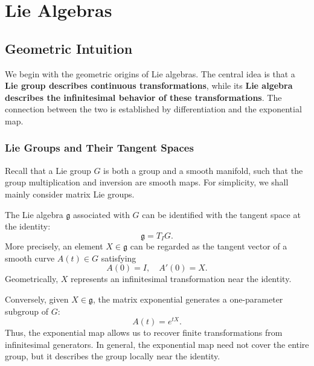 \documentclass[../main.tex]{subfiles}
\begin{document}
\chapter{Lie Algebras}

\section{Geometric Intuition}

We begin with the geometric origins of Lie algebras. The central idea is that a \textbf{Lie group describes continuous transformations}, while its \textbf{Lie algebra describes the infinitesimal behavior of these transformations}. The connection between the two is established by differentiation and the exponential map.

\subsection{Lie Groups and Their Tangent Spaces}

Recall that a Lie group $G$ is both a group and a smooth manifold, such that the group multiplication and inversion are smooth maps. For simplicity, we shall mainly consider matrix Lie groups.

The Lie algebra $\mathfrak{g}$ associated with $G$ can be identified with the tangent space at the identity:
\begin{equation}
  \mathfrak{g}=T_I G.
\end{equation}
More precisely, an element $X\in\mathfrak{g}$ can be regarded as the tangent vector of a smooth curve $A(t)\in G$ satisfying
\begin{equation}
  A(0)=I,\quad A'(0)=X.
\end{equation}
Geometrically, $X$ represents an infinitesimal transformation near the identity.

Conversely, given $X\in\mathfrak{g}$, the matrix exponential generates a one-parameter subgroup of $G$:
\begin{equation}
  A(t)=e^{tX}.
\end{equation}
Thus, the exponential map allows us to recover finite transformations from infinitesimal generators. In general, the exponential map need not cover the entire group, but it describes the group locally near the identity.
\end{document}
